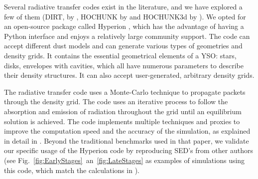 Several radiative transfer codes exist in the literature, and we have explored a few of them (DIRT, by \citet{Wolfire:1986fw}, HOCHUNK by \citet{Whitney:2003ke} and HOCHUNK3d by \citet{Whitney:2013cw}). We opted for an open-source package called Hyperion \citep{Robitaille:2011fc}, which has the advantage of having a Python interface and enjoys a relatively large community support. The code can accept different dust models and can generate various types of geometries and density grids. It contains the essential geometrical elements of a YSO: stars, disks, envelopes with cavities, which all have numerous parameters to describe their density structures. It can also accept user-generated, arbitrary density grids.

The radiative transfer code uses a Monte-Carlo technique to propagate packets through the density grid. The code uses an iterative process to follow the absorption and emission of radiation throughout the grid until an equilibrium solution is achieved. The code implements multiple techniques and proxies to improve the computation speed and the accuracy of the simulation, as explained in detail in \citet{Robitaille:2011fc}. Beyond the traditional benchmarks used in that paper, we validate our specific usage of the Hyperion code by reproducing SED's from other authors (see Fig.~\ref{fig:EarlyStages}~an~\ref{fig:LateStages} as examples of simulations using this code, which match the calculations in \citet{Whitney:2003kc}). 

